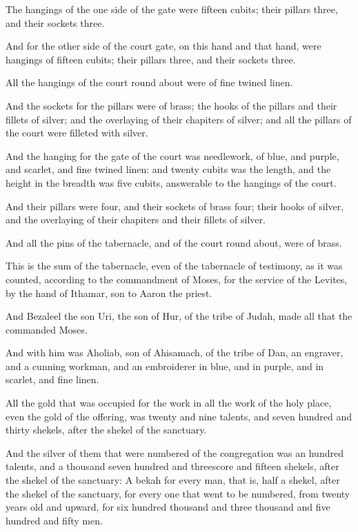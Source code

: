 \verse The hangings of the one side of the gate were fifteen cubits; their pillars three, and their sockets three.

\verse And for the other side of the court gate, on this hand and that hand, were hangings of fifteen cubits; their pillars three, and their sockets three.

\verse All the hangings of the court round about were of fine twined linen.

\verse And the sockets for the pillars were of brass; the hooks of the pillars and their fillets of silver; and the overlaying of their chapiters of silver; and all the pillars of the court were filleted with silver.

\verse And the hanging for the gate of the court was needlework, of blue, and purple, and scarlet, and fine twined linen: and twenty cubits was the length, and the height in the breadth was five cubits, answerable to the hangings of the court.

\verse And their pillars were four, and their sockets of brass four; their hooks of silver, and the overlaying of their chapiters and their fillets of silver.

\verse And all the pins of the tabernacle, and of the court round about, were of brass.

\verse This is the sum of the tabernacle, even of the tabernacle of testimony, as it was counted, according to the commandment of Moses, for the service of the Levites, by the hand of Ithamar, son to Aaron the priest.

\verse And Bezaleel the son Uri, the son of Hur, of the tribe of Judah, made all that the \LORD commanded Moses.

\verse And with him was Aholiab, son of Ahisamach, of the tribe of Dan, an engraver, and a cunning workman, and an embroiderer in blue, and in purple, and in scarlet, and fine linen.

\verse All the gold that was occupied for the work in all the work of the holy place, even the gold of the offering, was twenty and nine talents, and seven hundred and thirty shekels, after the shekel of the sanctuary.

\verse And the silver of them that were numbered of the congregation was an hundred talents, and a thousand seven hundred and threescore and fifteen shekels, after the shekel of the sanctuary: \verse A bekah for every man, that is, half a shekel, after the shekel of the sanctuary, for every one that went to be numbered, from twenty years old and upward, for six hundred thousand and three thousand and five hundred and fifty men.

